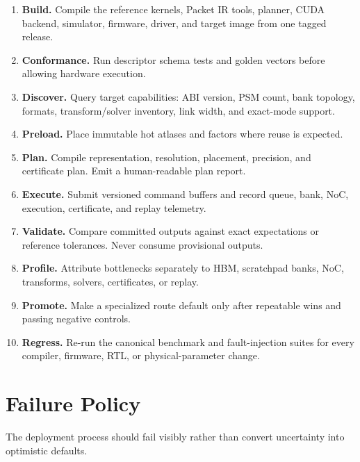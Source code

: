 \documentclass[10pt,letterpaper]{article}
\begin{document}
{{{\begin{enumerate}
\item \textbf{Build.} Compile the reference kernels, Packet IR tools, planner, CUDA backend, simulator, firmware, driver, and target image from one tagged release.
\item \textbf{Conformance.} Run descriptor schema tests and golden vectors before allowing hardware execution.
\item \textbf{Discover.} Query target capabilities: ABI version, PSM count, bank topology, formats, transform/solver inventory, link width, and exact-mode support.
\item \textbf{Preload.} Place immutable hot atlases and factors where reuse is expected.
\item \textbf{Plan.} Compile representation, resolution, placement, precision, and certificate plan. Emit a human-readable plan report.
\item \textbf{Execute.} Submit versioned command buffers and record queue, bank, NoC, execution, certificate, and replay telemetry.
\item \textbf{Validate.} Compare committed outputs against exact expectations or reference tolerances. Never consume provisional outputs.
\item \textbf{Profile.} Attribute bottlenecks separately to HBM, scratchpad banks, NoC, transforms, solvers, certificates, or replay.
\item \textbf{Promote.} Make a specialized route default only after repeatable wins and passing negative controls.
\item \textbf{Regress.} Re-run the canonical benchmark and fault-injection suites for every compiler, firmware, RTL, or physical-parameter change.
\end{enumerate}

\section{Failure Policy}

The deployment process should fail visibly rather than convert uncertainty into optimistic defaults.

}}}
\end{document}
